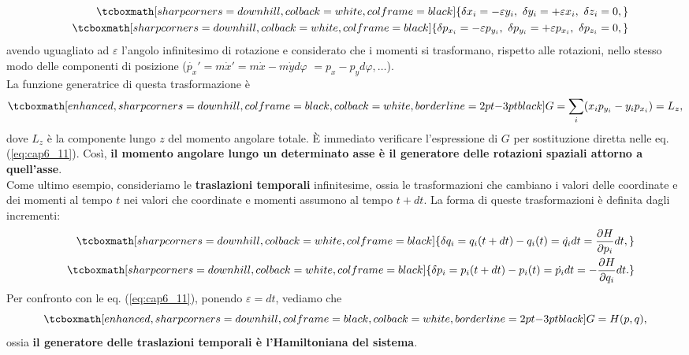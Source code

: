 	\begin{eqnarray}
			& & \tcboxmath[sharp corners=downhill, colback=white, colframe=black]{\delta x_i = -\varepsilon y_i, \ \delta y_i = +\varepsilon x_i, \ \delta z_i =0,}\\
			& &\tcboxmath[sharp corners=downhill, colback=white, colframe=black]{ \delta p_{x_i} = -\varepsilon p_{y_i}, \ \delta p_{y_i} = +\varepsilon p_{x_i}, \ \delta p_{z_i} =0,}
	\end{eqnarray}
avendo uguagliato ad $\varepsilon$ l'angolo infinitesimo di rotazione e considerato che i momenti si trasformano, rispetto alle rotazioni, nello stesso modo delle componenti di posizione ($\dot{p_x}'= m \dot{x}'=  m\dot{x}-m\dot{y}d\varphi$ $=p_x-p_yd\varphi , \dots$).\\
La funzione generatrice di questa trasformazione è
	\begin{equation}
		\tcboxmath[enhanced, sharp corners=downhill, colframe=black, colback=white, borderline={2pt}{-3pt}{black}]{
			G= \sum _i (x_ip_{y_i} - y_i p_{x_i}) = L_z ,
			}
	\end{equation}
dove $L_z$ è la componente lungo $z$ del momento angolare totale. È immediato verificare l'espressione di $G$ per sostituzione diretta nelle eq. (\ref{eq:cap6_11}). Così, \textbf{il momento angolare lungo un determinato asse è il generatore delle rotazioni spaziali attorno a quell'asse}.\\

Come ultimo esempio, consideriamo le \textbf{traslazioni temporali} infinitesime, ossia le trasformazioni che cambiano i valori delle coordinate e dei momenti al tempo $t$ nei valori che coordinate e momenti assumono al tempo $t+dt$. La forma di queste trasformazioni è definita dagli incrementi:
	\begin{eqnarray}
		& &\tcboxmath[sharp corners=downhill, colback=white, colframe=black]{
			\delta q_i = q_i(t+dt)-q_i(t) = \dot{q_i} dt = \frac{\partial H}{\partial p_i}dt,} \\
		& &\tcboxmath[sharp corners=downhill, colback=white, colframe=black]{
			\delta p_i = p_i(t+dt)-p_i(t) = \dot{p_i} dt = -\frac{\partial H}{\partial q_i}dt. }
	\end{eqnarray}
Per confronto con le eq. (\ref{eq:cap6_11}), ponendo $\varepsilon = dt$, vediamo che
	\begin{equation}
		\tcboxmath[enhanced, sharp corners=downhill, colframe=black, colback=white, borderline={2pt}{-3pt}{black}]{
			G=H(p,q) ,
			}
	\end{equation}
ossia \textbf{il generatore delle traslazioni temporali è l'Hamiltoniana del sistema}.\\

